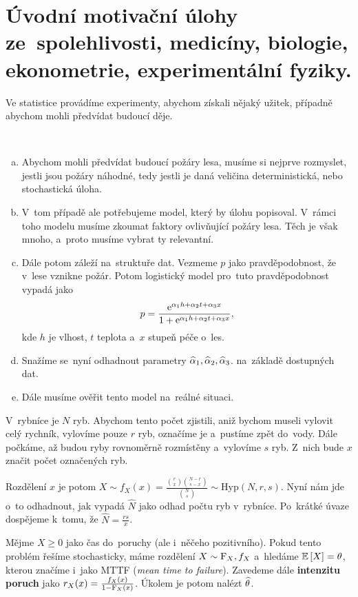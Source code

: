 \chapter{Úvodní motivační úlohy ze~spolehlivosti, medicíny, biologie, ekonometrie, experimentální fyziky.}
Ve statistice provádíme experimenty, abychom získali nějaký užitek, případně abychom mohli předvídat budoucí děje. 

\begin{example}~
	 \begin{enumerate}[a)]
		\item Abychom mohli předvídat budoucí požáry lesa, musíme si nejprve rozmyslet, jestli jsou požáry náhodné, tedy jestli je daná veličina deterministická, nebo stochastická úloha. 
		\item V~tom případě ale potřebujeme model, který by úlohu popisoval. V~rámci toho modelu musíme zkoumat faktory ovlivňující požáry lesa. Těch je však mnoho, a~proto musíme vybrat ty relevantní. 
		\item Dále potom záleží na~struktuře dat. Vezmeme $p$ jako pravděpodobnost, že v~lese vznikne požár. Potom logistický model pro~tuto pravděpodobnost vypadá jako
		$$ p=\frac{\mathrm{e}^{\alpha_1 h+\alpha_2t+\alpha_3x}}{1+\mathrm{e}^{\alpha_1 h+\alpha_2 t+\alpha_3 x}}, $$
		kde $h$ je vlhost, $t$ teplota a~$x$ stupeň péče o~les.
		\item Snažíme se~nyní odhadnout parametry $\widehat{\alpha}_1,\widehat{\alpha}_2,\widehat{\alpha}_3$. na~základě dostupných dat.
		\item Dále musíme ověřit tento model na~reálné situaci.
	\end{enumerate} 
\end{example}
\begin{example} V~rybníce je $N$ ryb. Abychom tento počet zjistili, aniž bychom museli vylovit celý rychník, vylovíme pouze $r$ ryb, označíme je a~pustíme zpět do~vody. Dále počkáme, až budou ryby rovnoměrně rozmístěny a~vylovíme $s$ ryb. Z~nich bude $x$ značit počet označených ryb.
	
Rozdělení $x$ je potom $X\sim f_X(x)=\frac{\binom{r}{x}\binom{N-r}{s-x}}{\binom{N}{s}}\sim\mathrm{Hyp}(N,r,s)$. Nyní nám jde o~to odhadnout, jak vypadá $\widehat{N}$ jako odhad počtu ryb v~rybníce. Po~krátké úvaze dospějeme k~tomu, že $\widehat{N}=\frac{rs}{x}$.
\end{example}
\begin{example}
	Mějme $X\geq0$ jako čas do~poruchy (ale i~něčeho pozitivního). Pokud tento problém řešíme stochasticky, máme rozdělení $X\sim \mathrm{F}_X,f_X$ a~hledáme $\mathbb{E}\left[ X \right]=\theta$, kterou značíme i~jako MTTF (\textit{mean time to failure}). Zavedeme dále \textbf{intenzitu poruch} jako $r_X(x)=\frac{f_X(x)}{1-\mathrm{F}_X(x)}$. Úkolem je potom nalézt $\widehat{\theta}$.
\end{example}
